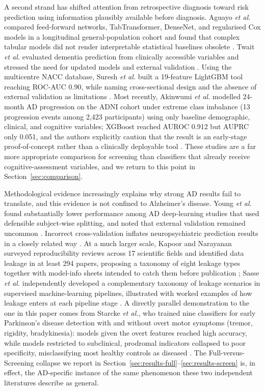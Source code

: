 \documentclass[conference]{IEEEtran}
\begin{document}
A second strand has shifted attention from retrospective diagnosis toward risk prediction using information plausibly available before diagnosis. Aguayo \textit{et al.} compared feed-forward networks, TabTransformer, DenseNet, and regularised Cox models in a longitudinal general-population cohort and found that complex tabular models did not render interpretable statistical baselines obsolete \cite{b26}. Twait \textit{et al.} evaluated dementia prediction from clinically accessible variables and stressed the need for updated models and external validation \cite{b27}. Using the multicentre NACC database, Suresh \textit{et al.} built a 19-feature LightGBM tool reaching ROC-AUC 0.90, while naming cross-sectional design and the absence of external validation as limitations \cite{b28}. Most recently, Akinwumi \textit{et al.} modelled 24-month AD progression on the ADNI cohort under extreme class imbalance (13 progression events among 2{,}423 participants) using only baseline demographic, clinical, and cognitive variables; XGBoost reached AUROC 0.912 but AUPRC only 0.051, and the authors explicitly caution that the result is an early-stage proof-of-concept rather than a clinically deployable tool \cite{b39}. These studies are a far more appropriate comparison for screening than classifiers that already receive cognitive-assessment variables, and we return to this point in Section~\ref{sec:comparison}.

Methodological evidence increasingly explains why strong AD results fail to translate, and this evidence is not confined to Alzheimer's disease. Young \textit{et al.} found substantially lower performance among AD deep-learning studies that used defensible subject-wise splitting, and noted that external validation remained uncommon \cite{b29}. Incorrect cross-validation inflates neuropsychiatric prediction results in a closely related way \cite{b30}. At a much larger scale, Kapoor and Narayanan surveyed reproducibility reviews across 17 scientific fields and identified data leakage in at least 294 papers, proposing a taxonomy of eight leakage types together with model-info sheets intended to catch them before publication \cite{b40}; Sasse \textit{et al.} independently developed a complementary taxonomy of leakage scenarios in supervised machine-learning pipelines, illustrated with worked examples of how leakage enters at each pipeline stage \cite{b41}. A directly parallel demonstration to the one in this paper comes from Starcke \textit{et al.}, who trained nine classifiers for early Parkinson's disease detection with and without overt motor symptoms (tremor, rigidity, bradykinesia): models given the overt features reached high accuracy, while models restricted to subclinical, prodromal indicators collapsed to poor specificity, misclassifying most healthy controls as diseased \cite{b42}. The Full-versus-Screening collapse we report in Section~\ref{sec:results-full}--\ref{sec:results-screen} is, in effect, the AD-specific instance of the same phenomenon these two independent literatures describe as general.
\end{document}
